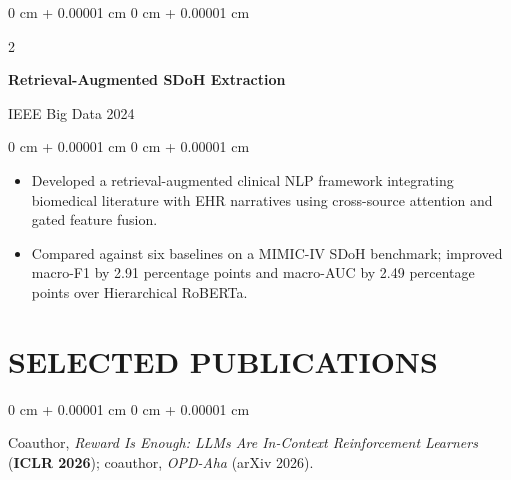 \documentclass[10pt, letterpaper]{article}
\newenvironment{highlights}{
    \begin{itemize}[
        topsep=0.03 cm,
        parsep=0.03 cm,
        partopsep=0pt,
        itemsep=0pt,
        leftmargin=0 cm + 10pt
    ]
}{
    \end{itemize}
} %
\newenvironment{onecolentry}{
    \begin{adjustwidth}{
        0 cm + 0.00001 cm
    }{
        0 cm + 0.00001 cm
    }
}{
    \end{adjustwidth}
} %
\newenvironment{twocolentry}[2][]{
    \onecolentry
    \def\secondColumn{#2}
    \setcolumnwidth{\fill, 4.5 cm}
    \begin{paracol}{2}
}{
    \switchcolumn \raggedleft \secondColumn
    \end{paracol}
    \endonecolentry
} %
\begin{document}
\begin{twocolentry}{IEEE Big Data 2024}
\textbf{Retrieval-Augmented SDoH Extraction}
\end{twocolentry}
\begin{onecolentry}
\begin{highlights}
\item Developed a retrieval-augmented clinical NLP framework integrating biomedical literature with EHR narratives using cross-source attention and gated feature fusion.
\item Compared against six baselines on a MIMIC-IV SDoH benchmark; improved macro-F1 by 2.91 percentage points and macro-AUC by 2.49 percentage points over Hierarchical RoBERTa.
\end{highlights}
\end{onecolentry}
\vspace{0.06 cm}
\section{SELECTED PUBLICATIONS}
\begin{onecolentry}
Coauthor, \textit{Reward Is Enough: LLMs Are In-Context Reinforcement Learners} (\textbf{ICLR 2026}); coauthor, \textit{OPD-Aha} (arXiv 2026).
\end{onecolentry}
\end{document}
